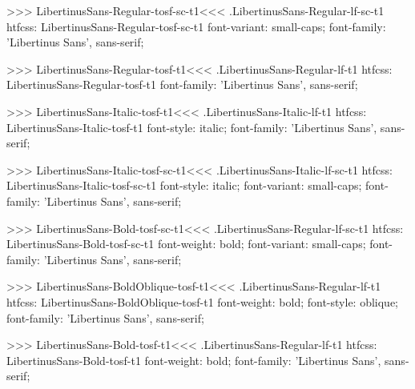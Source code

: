 {{{{>>>
\<LibertinusSans-Regular-tosf-sc-t1\><<<
.LibertinusSans-Regular-lf-sc-t1
htfcss:  LibertinusSans-Regular-tosf-sc-t1  font-variant: small-caps; font-family: 'Libertinus Sans', sans-serif;

>>>
\<LibertinusSans-Regular-tosf-t1\><<<
.LibertinusSans-Regular-lf-t1
htfcss:  LibertinusSans-Regular-tosf-t1  font-family: 'Libertinus Sans', sans-serif;

>>>
\<LibertinusSans-Italic-tosf-t1\><<<
.LibertinusSans-Italic-lf-t1
htfcss:  LibertinusSans-Italic-tosf-t1  font-style: italic; font-family: 'Libertinus Sans', sans-serif;

>>>
\<LibertinusSans-Italic-tosf-sc-t1\><<<
.LibertinusSans-Italic-lf-sc-t1
htfcss:  LibertinusSans-Italic-tosf-sc-t1  font-style: italic; font-variant: small-caps; font-family: 'Libertinus Sans', sans-serif;

>>>
\<LibertinusSans-Bold-tosf-sc-t1\><<<
.LibertinusSans-Regular-lf-sc-t1
htfcss:  LibertinusSans-Bold-tosf-sc-t1  font-weight: bold; font-variant: small-caps; font-family: 'Libertinus Sans', sans-serif;

>>>
\<LibertinusSans-BoldOblique-tosf-t1\><<<
.LibertinusSans-Regular-lf-t1
htfcss:  LibertinusSans-BoldOblique-tosf-t1  font-weight: bold; font-style: oblique; font-family: 'Libertinus Sans', sans-serif;

>>>
\<LibertinusSans-Bold-tosf-t1\><<<
.LibertinusSans-Regular-lf-t1
htfcss:  LibertinusSans-Bold-tosf-t1  font-weight: bold; font-family: 'Libertinus Sans', sans-serif;

}}}}
